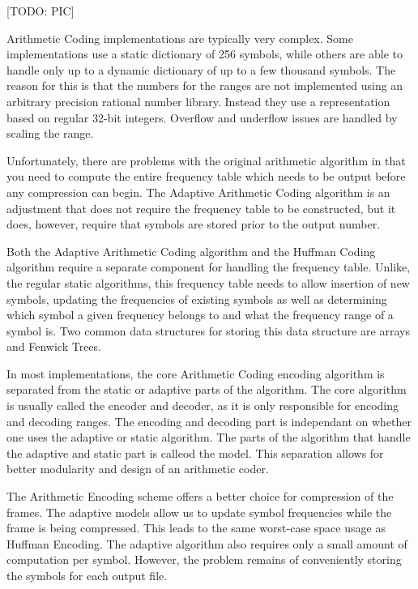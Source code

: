 \documentclass[a4paper,11pt]{report}
\begin{document}
[TODO: PIC]

Arithmetic Coding implementations are typically very complex. Some implementations use a static dictionary of 256 symbols, while others are able to handle only up to a dynamic dictionary of up to a few thousand symbols. The reason for this is that the numbers for the ranges are not implemented using an arbitrary precision rational number library. Instead they use a representation based on regular 32-bit integers. Overflow and underflow issues are handled by scaling the range.

Unfortunately, there are problems with the original arithmetic algorithm in that you need to compute the entire frequency table which needs to be output before any compression can begin. The Adaptive Arithmetic Coding algorithm is an adjustment that does not require the frequency table to be constructed, but it does, however, require that symbols are stored prior to the output number. 

Both the Adaptive Arithmetic Coding algorithm and the Huffman Coding algorithm require a separate component for handling the frequency table. Unlike, the regular static algorithms, this frequency table needs to allow insertion of new symbols, updating the frequencies of existing symbols as well as determining which symbol a given frequency belongs to and what the frequency range of a symbol is. Two common data structures for storing this data structure are arrays and Fenwick Trees.

In most implementations, the core Arithmetic Coding encoding algorithm is separated from the static or adaptive parts of the algorithm. The core algorithm is usually called the encoder and decoder, as it is only responsible for encoding and decoding ranges. The encoding and decoding part is independant on whether one uses the adaptive or static algorithm. The parts of the algorithm that handle the adaptive and static part is calleod the model. This separation allows for better modularity and design of an arithmetic coder.

The Arithmetic Encoding scheme offers a better choice for compression of the frames. The adaptive models allow us to update symbol frequencies while the frame is being compressed. This leads to the same worst-case space usage as Huffman Encoding. The adaptive algorithm also requires only a small amount of computation per symbol. However, the problem remains of conveniently storing the symbols for each output file.
\end{document}
